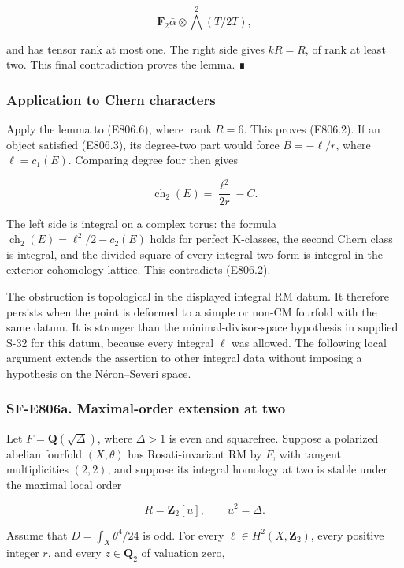 \[
 \mathbf F_2\bar\alpha\otimes
       \bigwedge^2(T/2T),
\]

and has tensor rank at most one. The right side gives \(kR=R\), of rank
at least two. This final contradiction proves the lemma. ∎

\subsubsection{Application to Chern
characters}\label{application-to-chern-characters}

Apply the lemma to (E806.6), where \(\operatorname{rank}R=6\). This
proves (E806.2). If an object satisfied (E806.3), its degree-two part
would force \(B=-\ell/r\), where \(\ell=c_1(E)\). Comparing degree four
then gives

\[
 \operatorname{ch}_2(E)=\frac{\ell^2}{2r}-C.
 \tag{E806.12}
\]

The left side is integral on a complex torus: the formula
\(\operatorname{ch}_2(E)=\ell^2/2-c_2(E)\) holds for perfect K-classes,
the second Chern class is integral, and the divided square of every
integral two-form is integral in the exterior cohomology lattice. This
contradicts (E806.2).

The obstruction is topological in the displayed integral RM datum. It
therefore persists when the point is deformed to a simple or non-CM
fourfold with the same datum. It is stronger than the
minimal-divisor-space hypothesis in supplied S-32 for this datum,
because every integral \(\ell\) was allowed. The following local
argument extends the assertion to other integral data without imposing a
hypothesis on the Néron--Severi space.

\subsubsection{SF-E806a. Maximal-order extension at
two}\label{SF-E806a}

Let \(F=\mathbf Q(\sqrt{\Delta})\), where \(\Delta>1\) is even and
squarefree. Suppose a polarized abelian fourfold \((X,\theta)\) has
Rosati-invariant RM by \(F\), with tangent multiplicities \((2,2)\), and
suppose its integral homology at two is stable under the maximal local
order

\[
 R=\mathbf Z_2[u],\qquad u^2=\Delta.
\]

Assume that \(D=\int_X\theta^4/24\) is odd. For every
\(\ell\in H^2(X,\mathbf Z_2)\), every positive integer \(r\), and every
\(z\in\mathbf Q_2\) of valuation zero,

